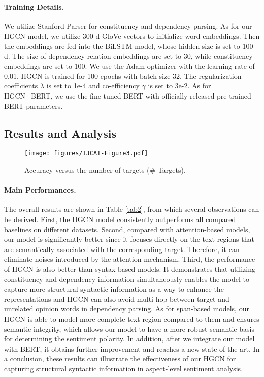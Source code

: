 \documentclass{article}
\begin{document}
\paragraph{Training Details.}
We utilize Stanford Parser \cite{manning2014stanford} for constituency and dependency parsing. As for our HGCN model, we utilize 300-d GloVe vectors \cite{pennington2014glove} to initialize word embeddings. Then the embeddings are fed into the BiLSTM model, whose hidden size is set to 100-d. The size of dependency relation embeddings are set to 30, while constituency embeddings are set to 100. We use the Adam optimizer with the learning rate of 0.01. HGCN is trained for 100 epochs with batch size 32. The regularization coefficients $\lambda$ is set to 1e-4 and co-efficiency $\gamma$ is set to 3e-2. As for HGCN+BERT, we use the fine-tuned BERT with officially released pre-trained BERT parameters.

\subsection{Results and Analysis}
\begin{figure}[t]
	\centering
	\texttt{[image: figures/IJCAI-Figure3.pdf]} \caption{Accuracy versus the number of targets (\# Targets).}
	\label{fig3}
\end{figure}

\paragraph{Main Performances.}
The overall results are shown in Table \ref{tab2}, from which several observations can be derived. First, the HGCN model consistently outperforms all compared baselines on different datasets. Second, compared with attention-based models, our model is significantly better since it focuses directly on the text regions that are semantically associated with the corresponding target. Therefore, it can eliminate noises introduced by the attention mechanism. Third, the performance of HGCN is also better than syntax-based models. It demonstrates that utilizing constituency and dependency information simultaneously enables the model to capture more structural syntactic information as a way to enhance the representations and HGCN can also avoid multi-hop between target and unrelated opinion words in dependency parsing. As for span-based models, our HGCN is able to model more complete text region compared to them and ensures semantic integrity, which allows our model to have a more robust semantic basis for determining the sentiment polarity. In addition, after we integrate our model with BERT, it obtains further improvement and reaches a new state-of-the-art. In a conclusion, these results can illustrate the effectiveness of our HGCN for capturing structural syntactic information in aspect-level sentiment analysis.
\end{document}
